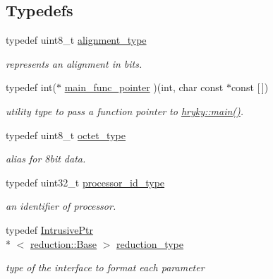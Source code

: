 \subsection*{Typedefs}
\begin{DoxyCompactItemize}
\item 
\hypertarget{namespacehryky_aee1af251193c2d308aaa68ef7e36a540}{typedef uint8\-\_\-t \hyperlink{namespacehryky_aee1af251193c2d308aaa68ef7e36a540}{alignment\-\_\-type}}\label{namespacehryky_aee1af251193c2d308aaa68ef7e36a540}

\begin{DoxyCompactList}\small\item\em represents an alignment in bits. \end{DoxyCompactList}\item 
\hypertarget{namespacehryky_a9135850015ed231a278a8871bef3d80e}{typedef int($\ast$ \hyperlink{namespacehryky_a9135850015ed231a278a8871bef3d80e}{main\-\_\-func\-\_\-pointer} )(int, char const $\ast$const \mbox{[}$\,$\mbox{]})}\label{namespacehryky_a9135850015ed231a278a8871bef3d80e}

\begin{DoxyCompactList}\small\item\em utility type to pass a function pointer to \hyperlink{namespacehryky_acf43d20e6c0b5e4b54931d42b46443a1}{hryky\-::main()}. \end{DoxyCompactList}\item 
\hypertarget{namespacehryky_a488cba8b666be33ccca70e819684e3c8}{typedef uint8\-\_\-t \hyperlink{namespacehryky_a488cba8b666be33ccca70e819684e3c8}{octet\-\_\-type}}\label{namespacehryky_a488cba8b666be33ccca70e819684e3c8}

\begin{DoxyCompactList}\small\item\em alias for 8bit data. \end{DoxyCompactList}\item 
\hypertarget{namespacehryky_a5e2737162aa470ce3920f86e86eac0bc}{typedef uint32\-\_\-t \hyperlink{namespacehryky_a5e2737162aa470ce3920f86e86eac0bc}{processor\-\_\-id\-\_\-type}}\label{namespacehryky_a5e2737162aa470ce3920f86e86eac0bc}

\begin{DoxyCompactList}\small\item\em an identifier of processor. \end{DoxyCompactList}\item 
\hypertarget{namespacehryky_a343a9a4c36a586be5c2693156200eadc}{typedef \hyperlink{classhryky_1_1_intrusive_ptr}{Intrusive\-Ptr}\\*
$<$ \hyperlink{classhryky_1_1reduction_1_1_base}{reduction\-::\-Base} $>$ \hyperlink{namespacehryky_a343a9a4c36a586be5c2693156200eadc}{reduction\-\_\-type}}\label{namespacehryky_a343a9a4c36a586be5c2693156200eadc}

\begin{DoxyCompactList}\small\item\em type of the interface to format each parameter \end{DoxyCompactList}\end{DoxyCompactItemize}
